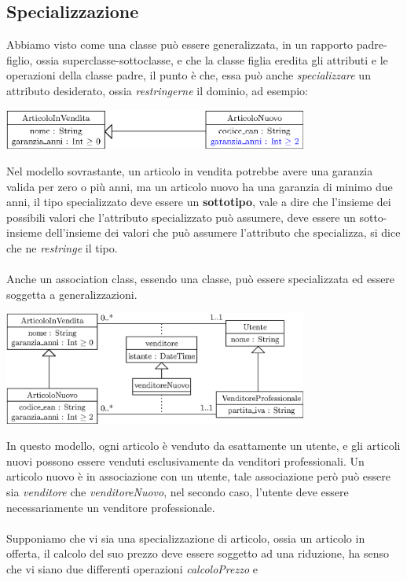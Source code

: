 \documentclass[12pt, letterpaper]{article}
\newcommand{\acc}{\\\hphantom{}\\}
\begin{document}
\subsection{Specializzazione}
Abbiamo visto come una classe può essere generalizzata, in un rapporto padre-figlio, ossia superclasse-sottoclasse, e
che la classe figlia eredita gli attributi e le operazioni della classe padre, il punto è che, essa può anche
\textit{specializzare} un attributo desiderato, ossia \textit{restringerne} il dominio, ad esempio:
\begin{center}
    \includegraphics[width=0.75\textwidth ]{images/specAttributo.eps}
\end{center}
Nel modello sovrastante, un articolo in vendita potrebbe avere una garanzia valida per zero o più anni, ma un articolo nuovo
ha una garanzia di minimo due anni, il tipo specializzato deve essere un \textbf{sottotipo}, vale a dire che l'insieme
dei possibili valori che l'attributo specializzato può assumere, deve essere un sotto-insieme dell'insieme dei valori che può
assumere l'attributo che specializza, si dice che ne \textit{restringe} il tipo.\acc
Anche un association class, essendo una classe, può essere specializzata ed essere soggetta a generalizzazioni.
\begin{center}
    \includegraphics[width=0.75\textwidth ]{images/specAssociazione.eps}
\end{center}
In questo modello, ogni articolo è venduto da esattamente un utente, e gli articoli nuovi possono essere venduti
esclusivamente da venditori professionali. Un articolo nuovo è in associazione con un utente, tale associazione però
può essere sia \textit{venditore} che \textit{venditoreNuovo}, nel secondo caso, l'utente deve essere necessariamente
un venditore professionale.\acc
Supponiamo che vi sia una specializzazione di articolo, ossia un articolo in offerta, il calcolo del suo prezzo deve
essere soggetto ad una riduzione, ha senso che vi siano due differenti operazioni \textit{calcoloPrezzo} e
\end{document}
